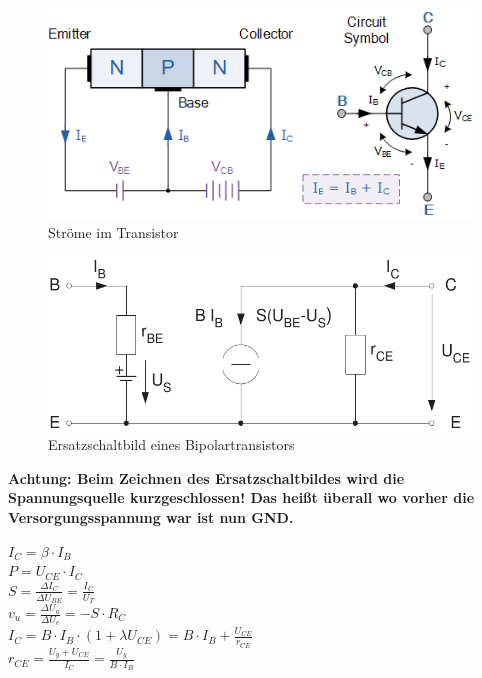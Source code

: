 \documentclass[a5paper, 12pt, twoside]{scrartcl}
\begin{document}
\begin{minipage}{.49\linewidth}
  \begin{figure}[H]
    \centering
    \includegraphics[width=\textwidth]{Transistor}
    \caption{Ströme im Transistor}
  \end{figure}
\end{minipage}\hfill\vline\hfill%
\begin{minipage}{.49\linewidth}
  \begin{figure}[H]
    \centering
    \includegraphics[width=\textwidth]{ESBTransistor}
    \caption{Ersatzschaltbild eines Bipolartransistors}
  \end{figure}
\end{minipage}

\textbf{Achtung: Beim Zeichnen des Ersatzschaltbildes wird die Spannungsquelle kurzgeschlossen! Das heißt überall wo vorher die Versorgungsspannung war ist nun GND.}

\dotfill\(I_C = \beta \cdot I_B\)\\[1em]
\dotfill\(P = U_{CE} \cdot I_C\)\\[1em]
\dotfill\(S = \frac{\Delta I_C}{\Delta U_{BE}} = \frac{I_C}{U_T}\)\\[1em]
\dotfill\(v_u = \frac{\Delta U_a}{\Delta U_e} = -S \cdot R_C\)\\[1em]
\dotfill\(I_C = B \cdot I_B \cdot (1 + \lambda U_{CE}) = B \cdot I_B + \frac{U_{CE}}{r_{CE}}\)\\[1em]
\dotfill\(r_{CE} = \frac{U_y + U_{CE}}{I_C} = \frac{U_y}{B \cdot I_B}\)
\end{document}
